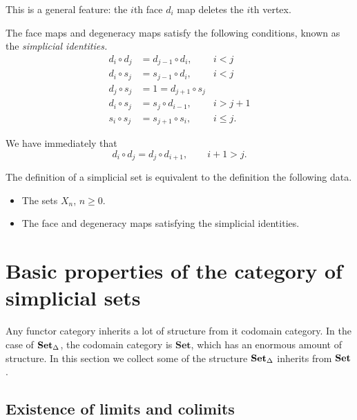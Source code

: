 \documentclass[main.tex]{subfiles}
\begin{document}
This is a general feature: the $i$th face $d_{i}$ map deletes the $i$th vertex.

\begin{theorem}
  \label{thm:simplicial_identities}
  The face maps and degeneracy maps satisfy the following conditions, known as the \emph{simplicial identities.}
  \begin{align*}
    d_{i} \circ d_{j} &= d_{j - 1} \circ d_{i},&i < j \\
    d_{i} \circ s_{j} &= s_{j-1} \circ d_{i}, &i < j \\
    d_{j} \circ s_{j} &= 1 = d_{j+1} \circ s_{j} \\
    d_{i} \circ s_{j} &= s_{j} \circ d_{i-1}, &i > j + 1 \\
    s_{i} \circ s_{j} &= s_{j+1} \circ s_{i}, &i \leq j.
  \end{align*}
\end{theorem}

\begin{corollary}
  We have immediately that
  \begin{equation*}
    d_{i} \circ d_{j} = d_{j} \circ d_{i+1},\qquad i+1 > j.
  \end{equation*}
\end{corollary}

\begin{fact}
  The definition of a simplicial set is equivalent to the definition the following data.
  \begin{itemize}
    \item The sets $X_{n}$, $n \geq 0$.
    \item The face and degeneracy maps satisfying the simplicial identities.
  \end{itemize}
\end{fact}

\section{Basic properties of the category of simplicial sets}
\label{sec:basic_properties_of_the_category_of_simplicial_sets}

Any functor category inherits a lot of structure from it codomain category. In the case of $\operatorname{\mathbf{Set}_{\Delta}}$, the codomain category is $\mathbf{Set}$, which has an enormous amount of structure. In this section we collect some of the structure $\operatorname{\mathbf{Set}_{\Delta}}$ inherits from $\mathbf{Set}$.

\subsection{Existence of limits and colimits}
\label{ssc:existence_of_limits_and_colimits}
\end{document}
